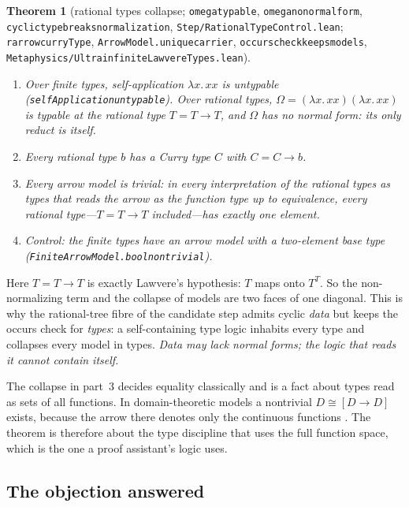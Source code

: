 \documentclass[]{article}
\newtheorem{theorem}{Theorem}
\theoremstyle{definition}
\theoremstyle{remark}
\newcommand{\codeus}{\textunderscore\allowbreak}
\newcommand{\code}[1]{\texttt{\let\_\codeus #1}}
\newcommand{\lpath}[1]{{\ttfamily\nolinkurl{#1}}}
\newcommand{\Om}{\Omega}
\newcommand{\meta}[1]{\lpath{Metaphysics/#1.lean}}
\newcommand{\step}[1]{\lpath{Step/#1.lean}}
\begin{document}
\begin{theorem}[rational types collapse; \code{omega\_typable}, \code{omega\_no\_normal\_form},
\code{cyclic\_type\_breaks\_normalization}, \step{RationalTypeControl};
\code{rarrow\_curryType}, \code{ArrowModel.unique\_carrier}, \code{occurs\_check\_keeps\_models},
\meta{UltrainfiniteLawvereTypes}]
\label{thm:rationaltypes}
\leavevmode
\begin{enumerate}
\item Over finite types, self-application $\lambda x.\,xx$ is untypable
  (\code{selfApplication\_untypable}). Over rational types,
  $\Om=(\lambda x.\,xx)(\lambda x.\,xx)$ is typable at the rational type $T=T\to T$, and $\Om$ has no
  normal form: its only reduct is itself.
\item Every rational type $b$ has a Curry type $C$ with $C=C\to b$.
\item \emph{Every arrow model is trivial}: in every interpretation of the rational types as types
  that reads the arrow as the function type up to equivalence, every rational type---$T=T\to T$
  included---has exactly one element.
\item \emph{Control}: the finite types have an arrow model with a two-element base type
  (\code{FiniteArrowModel.bool\_nontrivial}).
\end{enumerate}
\end{theorem}

Here $T=T\to T$ is exactly Lawvere's hypothesis: $T$ maps onto $T^{T}$. So the non-normalizing
term and the collapse of models are two faces of one diagonal. This is why the rational-tree fibre of
the candidate step admits cyclic \emph{data} but keeps the occurs check for \emph{types}: a
self-containing type logic inhabits every type and collapses every model in types.
\emph{Data may lack normal forms; the logic that reads it cannot contain itself.}

The collapse in part~3 decides equality classically and is a fact about types read as sets of all
functions. In domain-theoretic models a nontrivial $D\cong[D\to D]$ exists, because the arrow there
denotes only the continuous functions \cite{Scott1972}. The theorem is therefore about the type
discipline that uses the full function space, which is the one a proof assistant's logic uses.

\subsection{The objection answered}
\label{sec:nf-answer}
\end{document}
